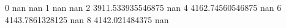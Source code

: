 0 nan nan
1 nan nan
2 3911.533935546875 nan
4 4162.74560546875 nan
6 4143.7861328125 nan
8 4142.021484375 nan
